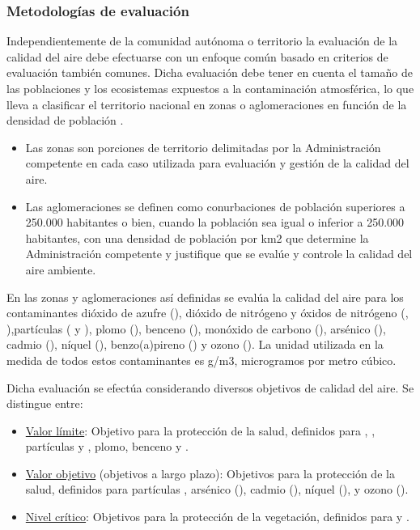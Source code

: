 \subsubsection{Metodologías de evaluación}

Independientemente de la comunidad autónoma o territorio  la evaluación de la calidad del aire debe efectuarse con un enfoque común basado en criterios de evaluación también comunes. Dicha evaluación debe tener en cuenta el tamaño de las poblaciones y los ecosistemas expuestos a la contaminación atmosférica, lo que lleva a clasificar el territorio nacional en zonas o aglomeraciones en función de la densidad de población \cite{casado_reinaldos_big_2018}.

\begin{itemize}
	\item Las zonas son porciones de territorio delimitadas por la Administración competente
	en cada caso utilizada para evaluación y gestión de la calidad del aire.
	\item Las aglomeraciones se definen como conurbaciones de población superiores a 250.000	habitantes o bien, cuando la población sea igual o inferior a 250.000 habitantes, con	una densidad de población por km2 que determine la Administración competente y
	justifique que se evalúe y controle la calidad del aire ambiente.
\end{itemize}

En las zonas y aglomeraciones así definidas se evalúa la calidad del aire para los contaminantes dióxido de azufre (), dióxido de nitrógeno y óxidos de nitrógeno (, ),partículas ( y ), plomo (), benceno (), monóxido de carbono (), arsénico (), cadmio (), níquel (), benzo(a)pireno () y ozono (). La unidad utilizada en la medida de todos estos contaminantes es \textmugreek g/m3, microgramos por metro cúbico.

Dicha evaluación se efectúa considerando diversos objetivos de calidad del aire. 
Se distingue entre:
\begin{itemize}
	\item \underline{Valor límite}: Objetivo para la protección de la salud, definidos para , ,
			partículas  y , plomo, benceno y .
	\item \underline{Valor objetivo} (objetivos a largo plazo): Objetivos para la protección de la salud,	definidos para partículas , arsénico (), cadmio (), níquel (),  y ozono  ().
	\item	\underline{Nivel crítico}: Objetivos para la protección de la vegetación, definidos para  y
	.
\end{itemize}

